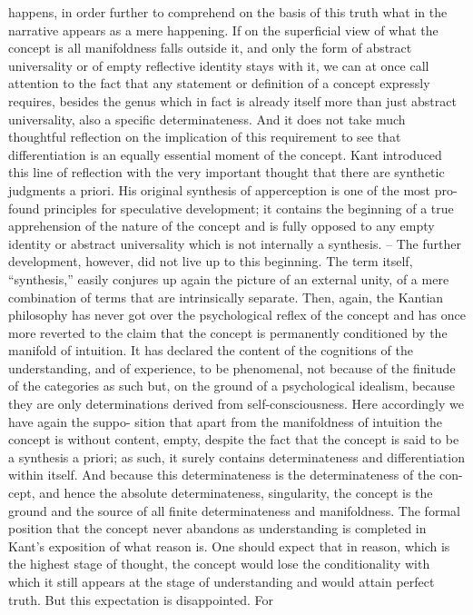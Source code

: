 happens, in order further to comprehend on the basis of this truth what in
the narrative appears as a mere happening.
If on the superficial view of what the concept is all manifoldness falls
outside it, and only the form of abstract universality or of empty reflective
identity stays with it, we can at once call attention to the fact that any
statement or definition of a concept expressly requires, besides the genus
which in fact is already itself more than just abstract universality, also a
specific determinateness. And it does not take much thoughtful reflection on
the implication of this requirement to see that differentiation is an equally
essential moment of the concept. Kant introduced this line of reflection
with the very important thought that there are synthetic judgments
a priori. His original synthesis of apperception is one of the most pro-
found principles for speculative development; it contains the beginning of
a true apprehension of the nature of the concept and is fully opposed to any
empty identity or abstract universality which is not internally a synthesis. –
The further development, however, did not live up to this beginning. The
term itself, “synthesis,” easily conjures up again the picture of an external
unity, of a mere combination of terms that are intrinsically separate. Then,
again, the Kantian philosophy has never got over the psychological reflex
of the concept and has once more reverted to the claim that the concept is
permanently conditioned by the manifold of intuition. It has declared the
content of the cognitions of the understanding, and of experience, to be
phenomenal, not because of the finitude of the categories as such but, on the
ground of a psychological idealism, because they are only determinations
derived from self-consciousness. Here accordingly we have again the suppo-
sition that apart from the manifoldness of intuition the concept is without
content, empty, despite the fact that the concept is said to be a synthesis a
priori; as such, it surely contains determinateness and differentiation within
itself. And because this determinateness is the determinateness of the con-
cept, and hence the absolute determinateness, singularity, the concept is the
ground and the source of all finite determinateness and manifoldness.
The formal position that the concept never abandons as understanding
is completed in Kant’s exposition of what reason is. One should expect that
in reason, which is the highest stage of thought, the concept would lose
the conditionality with which it still appears at the stage of understanding
and would attain perfect truth. But this expectation is disappointed. For
